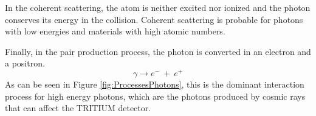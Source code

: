 In the coherent scattering, the atom is neither excited nor ionized and the photon conserves its energy in the collision. Coherent scattering is probable for photons with low energies and materials with high atomic numbers. %

Finally, in the pair production process, the photon is converted in an electron and a positron. 
\begin{equation}
\gamma \longrightarrow e^- ~ + ~ e^+
\label{eq:pairproductionprocess}
\end{equation}
As can be seen in Figure \ref{fig:ProcessesPhotons}, this is the dominant interaction process for high energy photons, which are the photons produced by cosmic rays that can affect the TRITIUM detector.


